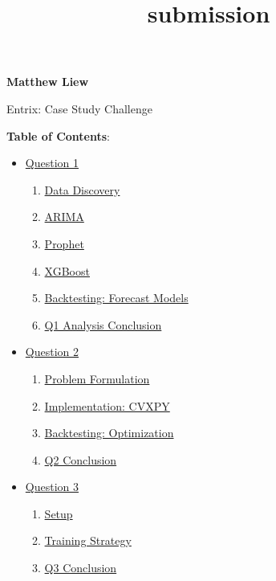 \documentclass[11pt]{article}
\title{submission}
\providecommand{\tightlist}{%
      \setlength{\itemsep}{0pt}\setlength{\parskip}{0pt}}
\begin{document}
    
    \maketitle
    
    

    
    \textbf{Matthew Liew}

{Entrix: Case Study Challenge}

\textbf{Table of Contents}:

\begin{itemize}
\tightlist
\item
  \hyperref[q1]{Question 1}

  \begin{enumerate}
  \def\labelenumi{\arabic{enumi}.}
  \tightlist
  \item
    \hyperref[discovery]{Data Discovery}
  \item
    \hyperref[arima]{ARIMA}
  \item
    \hyperref[prophet]{Prophet}
  \item
    \hyperref[xgboost]{XGBoost}
  \item
    \hyperref[backtesting_forecast]{Backtesting: Forecast Models}
  \item
    \hyperref[q1_conclusion]{Q1 Analysis Conclusion}
  \end{enumerate}
\item
  \hyperref[q2]{Question 2}

  \begin{enumerate}
  \def\labelenumi{\arabic{enumi}.}
  \tightlist
  \item
    \hyperref[problem]{Problem Formulation}
  \item
    \hyperref[opt_implementation]{Implementation: CVXPY}
  \item
    \hyperref[backtest_opt]{Backtesting: Optimization}
  \item
    \hyperref[q2_con]{Q2 Conclusion}
  \end{enumerate}
\item
  \hyperref[6]{Question 3}

  \begin{enumerate}
  \def\labelenumi{\arabic{enumi}.}
  \tightlist
  \item
    \hyperref[setup]{Setup}
  \item
    \hyperref[training]{Training Strategy}
  \item
    \hyperref[q3_con]{Q3 Conclusion}
  \end{enumerate}
\end{itemize}
\end{document}
